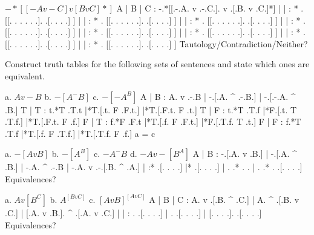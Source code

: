 $ -*[[-A v -C] v [B v C]*] $
	\answer
	\truthtable
	 A | B | C :  -.*[[.-.A. v .-.C.]. v .[.B. v .C.]*]
	\truthtableline
	   |   |   : * . [[. . .   . . .].   .[. .   . .] ]
	   |   |   : * . [[. . .   . . .].   .[. .   . .] ]
	   |   |   : * . [[. . .   . . .].   .[. .   . .] ]
	   |   |   : * . [[. . .   . . .].   .[. .   . .] ]
	   |   |   : * . [[. . .   . . .].   .[. .   . .] ]
	   |   |   : * . [[. . .   . . .].   .[. .   . .] ]
	   |   |   : * . [[. . .   . . .].   .[. .   . .] ]
	   |   |   : * . [[. . .   . . .].   .[. .   . .] ]
	\endtruthtable
	Tautology/Contradiction/Neither?
	\endanswer

\endproblems

Construct truth tables for the following sets of sentences and state which ones are equivalent.

\problems
{}
\list
a. $ A v -B $
b. $ -[A ^ -B] $
c. $ -[-A ^ B] $
\endlist
	\answer
	\truthtable
	 A | B : A. v .-.B | -.[.A. ^ .-.B.] | -.[.-.A. ^ .B.]
	\truthtableline
	 T | T : t.*T .T.t |*T.[.t. F .F.t.] |*T.[.F.t. F .t.]
	 T | F : t.*T .T.f |*F.[.t. T .T.f.] |*T.[.F.t. F .f.]
	 F | T : f.*F .F.t |*T.[.f. F .F.t.] |*F.[.T.f. T .t.]
	 F | F : f.*T .T.f |*T.[.f. F .T.f.] |*T.[.T.f. F .f.]
	\endtruthtable
	a = c
	\endanswer

\list
a. $ -[A v B] $
b. $ -[A ^ B] $
c. $ -A ^ -B $
d. $ -A v -[B ^ A] $
\endlist
	\answer
	\truthtable
	 A | B : -.[.A. v .B.] | -.[.A. ^ .B.] | -.A. ^ .-.B | -.A. v .-.[.B. ^ .A.]
	\truthtableline
	   |   :* .[. .   . .] |* .[. .   . .] |  . .*  . .  |  . .*  . .[. .   . .]
	\endtruthtable
	Equivalences?
	\endanswer

\list
a. $ A v [B ^ C] $
b. $ A ^ [B v C] $
c. $ [A v B] ^ [A v C] $
\endlist
	\answer
	\truthtable
	 A | B | C : A. v .[.B. ^ .C.] | A. ^ .[.B. v .C.] | [.A. v .B.]. ^ .[.A. v .C.]
	\truthtableline
	   |   |   :  .   .[. .   . .] |  .   .[. .   . .] | [. .   . .].   .[. .   . .]
	\endtruthtable
	Equivalences?
	\endanswer

\endproblems
\bye
